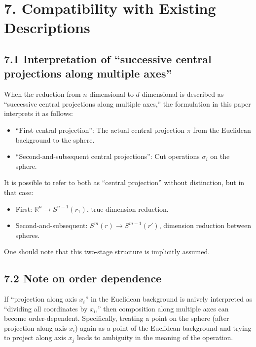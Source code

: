 \documentclass[a4paper,11pt]{article}
\theoremstyle{definition}
\theoremstyle{remark}
\providecommand{\tightlist}{%
  \setlength{\itemsep}{0pt}\setlength{\parskip}{0pt}}
\begin{document}
\section{7. Compatibility with Existing
Descriptions}\label{compatibility-with-existing-descriptions}

\subsection{7.1 Interpretation of ``successive central projections along
multiple
axes''}\label{interpretation-of-successive-central-projections-along-multiple-axes}

When the reduction from \(n\)-dimensional to \(d\)-dimensional is
described as ``successive central projections along multiple axes,'' the
formulation in this paper interprets it as follows:

\begin{itemize}
\tightlist
\item
  ``First central projection'': The actual central projection \(\pi\)
  from the Euclidean background to the sphere.
\item
  ``Second-and-subsequent central projections'': Cut operations
  \(\sigma_i\) on the sphere.
\end{itemize}

It is possible to refer to both as ``central projection'' without
distinction, but in that case:

\begin{itemize}
\tightlist
\item
  First: \(\mathbb{R}^n \to S^{n-1}(r_1)\), true dimension reduction.
\item
  Second-and-subsequent: \(S^m(r) \to S^{m-1}(r')\), dimension reduction
  between spheres.
\end{itemize}

One should note that this two-stage structure is implicitly assumed.

\subsection{7.2 Note on order
dependence}\label{note-on-order-dependence}

If ``projection along axis \(x_i\)'' in the Euclidean background is
naively interpreted as ``dividing all coordinates by \(x_i\),'' then
composition along multiple axes can become order-dependent.
Specifically, treating a point on the sphere (after projection along
axis \(x_i\)) again as a point of the Euclidean background and trying to
project along axis \(x_j\) leads to ambiguity in the meaning of the
operation.
\end{document}
